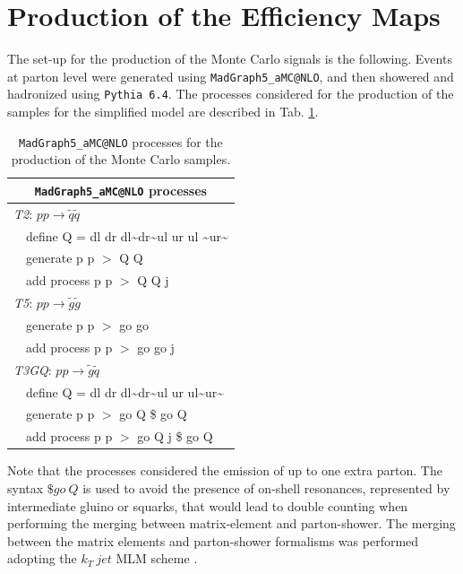 \documentclass[preprint,number,sort&compress,twocolumn,3p]{elsstyarticle}
\newcommand{\TGQ}{ \textit{T3GQ}}
\newcommand{\Ttwo}{ \textit{T2}}
\newcommand{\Tfive}{ \textit{T5}}
\begin{document}
\section{Production of the Efficiency Maps}\label{EMprod}
The set-up for the production of the Monte Carlo signals is the following. Events at parton level were generated using \texttt{MadGraph5\_aMC@NLO}\cite{Alwall:2011uj}, and then showered and hadronized using \texttt{Pythia 6.4}\cite{Sjostrand:2006za}. The processes considered for the production of the samples for the simplified model are described in Tab. \ref{mg5_processes}.
\begin{table}[!h]
	\begin{center}
		\renewcommand{\arraystretch}{1.3}
		\begin{tabular}{ l l }  \toprule  \toprule 
			\multicolumn{2}{c}{\texttt{MadGraph5\_aMC@NLO} processes} \\ \toprule \toprule
			\multicolumn{2}{l}{\Ttwo: $p p \rightarrow \tilde q \tilde q$}  \\
			& define Q = dl dr dl\textasciitilde dr\textasciitilde ul ur ul \textasciitilde ur\textasciitilde \\
			& generate p p $>$ Q Q  \\
			&  add process p p $>$ Q Q j \\  \toprule 
			\multicolumn{2}{l}{\Tfive: $p p \rightarrow \tilde g \tilde g$ } \\ 
			& generate p p $>$ go go \\
			&  add process p p $>$ go go j \\ \toprule 
			\multicolumn{2}{l}{\TGQ: $p p \rightarrow \tilde g \tilde q$} \\  
			&  define Q = dl dr dl\textasciitilde dr\textasciitilde ul ur ul\textasciitilde ur\textasciitilde \\
			&  generate p p $>$ go Q \$ go Q \\
			&  add process p p $>$ go Q j \$ go Q \\  \bottomrule \bottomrule 
		\end{tabular}
	\end{center}
	\caption{\texttt{MadGraph5\_aMC@NLO} processes for the production of the Monte Carlo samples.}
	\label{mg5_processes}
\end{table}
Note that the processes considered the emission of up to one extra parton. The syntax $\$go \ Q$ is used to avoid the presence of on-shell resonances, represented by intermediate gluino or squarks, that would lead to double counting when performing the merging between matrix-element and parton-shower. The merging between the matrix elements and parton-shower formalisms was performed adopting the $k_T \ jet$ MLM scheme \cite{MLM,Alwall:2007fs}. 
\end{document}
